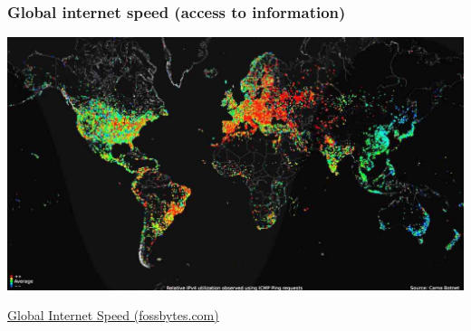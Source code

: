 \begin{frame}

\frametitle{ Global internet speed (access to information)  }

\begin{center}
 \includegraphics[width=\textwidth,keepaspectratio=true]{./images/internet-users-map-1.jpg}
\end{center}
\href{https://fossbytes.com/top-10-countries-having-the-fastest-average-internet-speed/}{Global Internet Speed (fossbytes.com)}

\end{frame}

